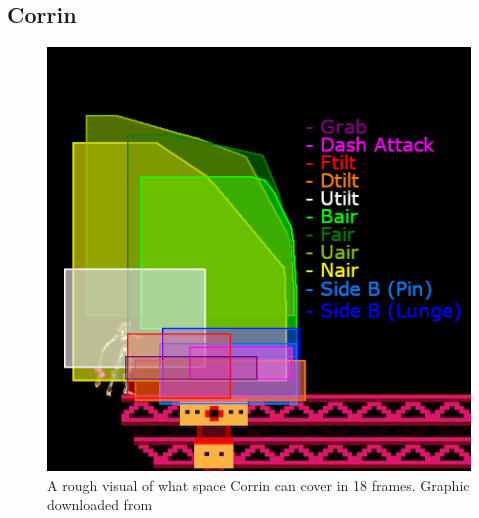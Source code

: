 \subsection{Corrin}

\begin{figure}[h]
    \centering
    \includegraphics[width=.4\textwidth]{images/threat-ranges/corrin}
    \caption{A rough visual of what space Corrin can cover in 18 frames. Graphic downloaded from\cite{ref:zovrah:threat-range:corrin}}
\end{figure}

